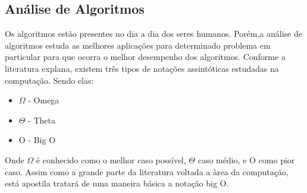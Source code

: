 \subsection{Análise de Algoritmos}
Os algoritmos estão presentes no dia a dia dos seres humanos. Porém,a análise de algoritmos estuda as melhores aplicações para determinado problema em particular para que ocorra o melhor desempenho dos algoritmos.
    Conforme a literatura explana, existem três tipos de notações assintóticas estudadas na computação. Sendo elas:
    \begin{itemize}
        \item $\Omega$ - Omega
        \item $\Theta$ - Theta
        \item O - Big O
    \end{itemize}
    Onde $\Omega$ é conhecido como o melhor caso possível, $\Theta$ caso médio, e O como pior caso. Assim como a grande parte da literatura voltada a àrea da computação, está apostila tratará de uma maneira básica a notação big O.
    

